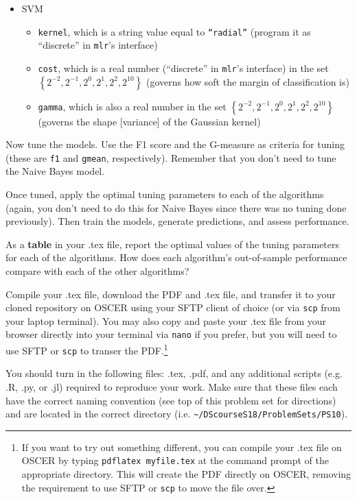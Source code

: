 \documentclass[12pt,english]{exam}
\begin{document}
\begin{questions}
\begin{itemize}
\begin{itemize}
    \end{itemize}
\item SVM
    \begin{itemize}
    \item \texttt{kernel}, which is a string value equal to \texttt{``radial''} (program it as ``discrete'' in \texttt{mlr}'s interface)
    \item \texttt{cost}, which is a real number (``discrete'' in \texttt{mlr}'s interface) in the set $\left\{2^{-2},2^{-1},2^{0},2^{1},2^{2},2^{10}\right\}$ (governs how soft the margin of classification is)
    \item \texttt{gamma}, which is also a real number in the set $\left\{2^{-2},2^{-1},2^{0},2^{1},2^{2},2^{10}\right\}$ (governs the shape [variance] of the Gaussian kernel) 
    \end{itemize}
\end{itemize}


\question Now tune the models. Use the F1 score and the G-measure as criteria for tuning (these are \texttt{f1} and \texttt{gmean}, respectively). Remember that you don't need to tune the Naive Bayes model.

\question Once tuned, apply the optimal tuning parameters to each of the algorithms (again, you don't need to do this for Naive Bayes since there was no tuning done previously). Then train the models, generate predictions, and assess performance.

\question As a \textbf{table} in your .tex file, report the optimal values of the tuning parameters for each of the algorithms. How does each algorithm's out-of-sample performance compare with each of the other algorithms?

\question Compile your .tex file, download the PDF and .tex file, and transfer it to your cloned repository on OSCER using your SFTP client of choice (or via \texttt{scp} from your laptop terminal). You may also copy and paste your .tex file from your browser directly into your terminal via \texttt{nano} if you prefer, but you will need to use SFTP or \texttt{scp} to transer the PDF.\footnote{If you want to try out something different, you can compile your .tex file on OSCER by typing \texttt{pdflatex myfile.tex} at the command prompt of the appropriate directory. This will create the PDF directly on OSCER, removing the requirement to use SFTP or \texttt{scp} to move the file over.}

\question You should turn in the following files: .tex, .pdf, and any additional scripts (e.g. .R, .py, or .jl) required to reproduce your work.  Make sure that these files each have the correct naming convention (see top of this problem set for directions) and are located in the correct directory (i.e. \texttt{\textasciitilde/DScourseS18/ProblemSets/PS10}).


\end{questions}
\end{document}
